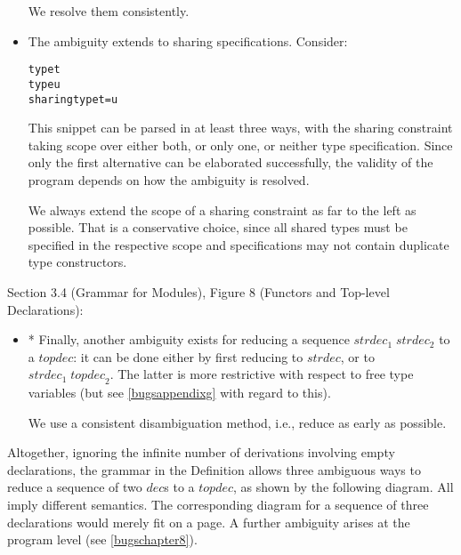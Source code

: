 \documentclass[twoside,titlepage]{article}
\begin{document}
\begin{appendix}
\begin{itemize}
We resolve them consistently.

\item The ambiguity extends to sharing specifications. Consider:

\begin{quoting}
\begin{alltt}
type t
type u
sharing type t = u
\end{alltt}
\end{quoting}

This snippet can be parsed in at least three ways, with the sharing constraint taking scope over either both, or only one, or neither type specification. Since only the first alternative can be elaborated successfully, the validity of the program depends on how the ambiguity is resolved.

We always extend the scope of a sharing constraint as far to the left as possible. That is a conservative choice, since all shared types must be specified in the respective scope and specifications may not contain duplicate type constructors.

\end{itemize}


Section 3.4 (Grammar for Modules), Figure 8 (Functors and Top-level Declarations):

\begin{itemize}

\item * Finally, another ambiguity exists for reducing a sequence $\mathit{strdec}_1\;\mathit{strdec}_2$ to a $\mathit{topdec}$: it can be done either by first reducing to $\mathit{strdec}$, or to $\mathit{strdec}_1\;\mathit{topdec}_2$. The latter is more restrictive with respect to free type variables (but see \ref{bugsappendixg} with regard to this).

We use a consistent disambiguation method, i.e., reduce as early as possible.

\end{itemize}

Altogether, ignoring the infinite number of derivations involving empty declarations, the grammar in the Definition allows three ambiguous ways to reduce a sequence of two $\mathit{dec}$s to a $\mathit{topdec}$, as shown by the following diagram. All imply different semantics. The corresponding diagram for a sequence of three declarations would merely fit on a page. A further ambiguity arises at the program level (see \ref{bugschapter8}).


\end{appendix}
\end{document}
